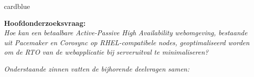 \documentclass[a0,portrait]{hogent-poster}
\begin{document}
    \begin{center}
        \begin{minipage}{0.96\linewidth}
            
            \noindent
            \begin{minipage}[t]{0.489\linewidth}
                \vspace{0pt}
                
                \begin{onderzoekskaart}[1. Onderzoeksvragen]{cardblue}
                    \begin{tcolorbox}[colback=posterbg, colframe=cardblue, boxrule=0.5mm, arc=3mm, top=5mm, bottom=5mm, left=5mm, right=5mm, shadow={3mm}{-3mm}{0mm}{black!5}]
                        \textbf{\color{cardblue}Hoofdonderzoeksvraag:}\\
                        \itshape Hoe kan een betaalbare Active-Passive High Availability webomgeving,
                        bestaande uit Pacemaker en Corosync op RHEL-compatibele nodes, geoptimaliseerd
                        worden om de RTO van de webapplicatie bij serveruitval te minimaliseren?
                    \end{tcolorbox}
                    
                    \vspace{0.2cm}
                    \noindent
                    {\small\color{cardblue}\itshape Onderstaande zinnen vatten de bijhorende deelvragen samen:}
                    

\end{onderzoekskaart}
\end{minipage}
\end{minipage}
\end{center}
\end{document}
